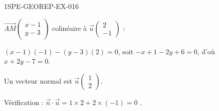 \begin{corrige}{1SPE-GEOREP-EX-016}


$\vec{AM}\begin{pmatrix} x-1 \\ y-3 \end{pmatrix}$ colinéaire à $\vec{u}\begin{pmatrix} 2 \\ -1 \end{pmatrix}$ :

$(x-1)(-1) - (y-3)(2) = 0$, soit $-x + 1 - 2y + 6 = 0$, d'où $\boxed{x + 2y - 7 = 0}$.

Un vecteur normal est $\vec{n}\begin{pmatrix} 1 \\ 2 \end{pmatrix}$.

Vérification : $\vec{n} \cdot \vec{u} = 1 \times 2 + 2 \times (-1) = 0$ \checkmark.

\end{corrige}

